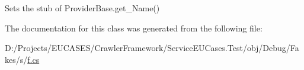 Sets the stub of Provider\-Base.\-get\-\_\-\-Name()



The documentation for this class was generated from the following file\-:\begin{DoxyCompactItemize}
\item 
D\-:/\-Projects/\-E\-U\-C\-A\-S\-E\-S/\-Crawler\-Framework/\-Service\-E\-U\-Cases.\-Test/obj/\-Debug/\-Fakes/s/\hyperlink{s_2f_8cs}{f.\-cs}\end{DoxyCompactItemize}

